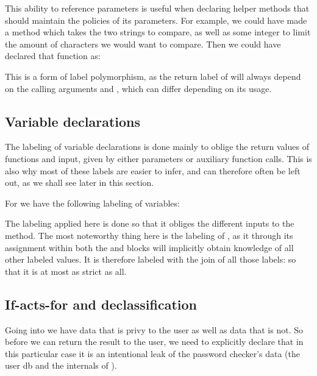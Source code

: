 This ability to reference parameters is useful when declaring helper methods that should maintain the policies of its parameters.
For example, we could have made a  method which takes the two strings to compare, as well as some integer to limit the amount of characters we would want to compare.
Then we could have declared that function as: \\
\begin{minipage}{\linewidth}
  \centering
\end{minipage}

This is a form of label polymorphism, as the return label of  will always depend on the calling arguments  and , which can differ depending on its usage.

\subsection{Variable declarations}
The labeling of variable declarations is done mainly to oblige the return values of functions and input, given by either parameters or auxiliary function calls.
This is also why most of these labels are easier to infer, and can therefore often be left out, as we shall see later in this section.

For  we have the following labeling of variables:\\
\begin{minipage}{\linewidth}

\end{minipage}

The labeling applied here is done so that it obliges the different inputs to the method.
The most noteworthy thing here is the labeling of , as it through its assignment within both the  and  blocks will implicitly obtain knowledge of all other labeled values.
It is therefore labeled with the join of all those labels:  so that it is at most as strict as all.

\subsection{If-acts-for and declassification}\label{ctif:informal:ifactsfor_declassify}
Going into  we have data that is privy to the user as well as data that is not.
So before we can return the result to the user, we need to explicitly declare that in this particular case it is an intentional leak of the password checker's data (the user db and the internals of ).

